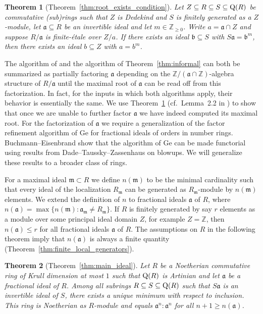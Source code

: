 \documentclass{amsart}
\theoremstyle{plain}
\newtheorem{theorem}{Theorem}[section]
\theoremstyle{definition}
\newcommand{\Z}{\ensuremath{\mathbb{Z}}}
\newcommand{\m}{\ensuremath{\mathfrak{m}}}
\begin{document}
\begin{theorem}[Theorem~\ref{thm:root_exists_condition}]\label{mainthm:root_exists_condition}
Let \(Z\subseteq R\subseteq S \subseteq \textup{Q}(R)\) be commutative (sub)rings such that \(Z\) is Dedekind and \(S\) is finitely generated as a \(Z\)-module, let \(\mathfrak{a}\subseteq R\) be an invertible ideal and let \(m\in\Z_{\geq 0}\).
Write \(a=\mathfrak{a}\cap Z\) and suppose \(R/\mathfrak{a}\) is finite-\'etale over \(Z/a\).
If there exists an ideal \(\mathfrak{b}\subseteq S\) with \(S\mathfrak{a}=\mathfrak{b}^m\), then there exists an ideal \(b\subseteq Z\) with \(a=b^m\).
\end{theorem}

The algorithm of \cite{Belabas} and the algorithm of Theorem~\ref{thm:informal} can both be summarized as partially factoring $\mathfrak{a}$ depending on the $\Z/(\mathfrak{a}\cap\Z)$-algebra structure of $R/\mathfrak{a}$ until the maximal root of $\mathfrak{a}$ can be read off from this factorization.
In fact, for the inputs in which both algorithms apply, their behavior is essentially the same.
We use Theorem~\ref{mainthm:root_exists_condition} (cf.\ Lemma~2.2 in \cite{Belabas}) to show that once we are unable to further factor $\mathfrak{a}$ we have indeed computed its maximal root.
For the factorization of $\mathfrak{a}$ we require a generalization of the factor refinement algorithm of Ge \cite{Ge} for fractional ideals of orders in number rings.
Buchmann--Eisenbrand \cite{Buchmann-Eisenbrand} show that the algorithm of Ge can be made functorial using results from Dade--Taussky--Zassenhaus \cite{Dade-Zassenhaus} on blowups.
We will generalize these results to a broader class of rings.

For a maximal ideal \(\m\subset R\) we define \(n(\m)\) to be the minimal cardinality such that every ideal of the localization \(R_\m\) can be generated as $R_\m$-module by \(n(\m)\) elements.
We extend the definition of \(n\) to fractional ideals \(\mathfrak{a}\) of \(R\), where \(n(\mathfrak{a})=\max\{n(\m) : \mathfrak{a}_\m \neq R_\m\}\).
If \(R\) is finitely generated by say \(r\) elements as a module over some principal ideal domain \(Z\), for example \(Z=\Z\), then \(n(\mathfrak{a})\leq r\) for all fractional ideals \(\mathfrak{a}\) of \(R\).
The assumptions on \(R\) in the following theorem imply that \(n(\mathfrak{a})\) is always a finite quantity (Theorem~\ref{thm:finite_local_generators}).

\begin{theorem}[Theorem~\ref{thm:main_ideal}]\label{mainthm:main_ideal}
Let \(R\) be a Noetherian commutative ring of Krull dimension at most \(1\) such that \(\textup{Q}(R)\) is Artinian and let \(\mathfrak{a}\) be a fractional ideal of \(R\).
Among all subrings \(R\subseteq S \subseteq\textup{Q}(R)\) such that \(S\mathfrak{a}\) is an invertible ideal of \(S\), there exists a unique minimum with respect to inclusion.
This ring is Noetherian as \(R\)-module and equals \(\mathfrak{a}^{n}:\mathfrak{a}^{n}\) for all \(n+1\geq n(\mathfrak{a})\). 
\end{theorem}
\end{document}
